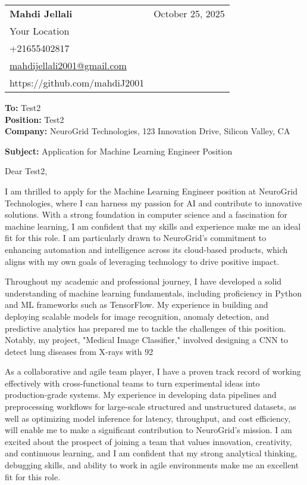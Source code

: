 \documentclass[letterpaper,11pt]{article}
\makeatletter
\newcommand{\letterHeading}[5]{
    \begin{tabular*}{\textwidth}{l@{\extracolsep{\fill}}r}
    \textbf{\Large #1} & #5 \\  %
    #2 & \\
    #3 & \\
    #4 & \\
    \end{tabular*}
    \vspace{15pt}
}
\newcommand{\letterRecipient}[3]{
    \textbf{\large To:} #1 \\
    \textbf{\large Position:} #2 \\
    \textbf{\large Company:} #3 \\
    \vspace{12pt}
}
\newcommand{\letterSubject}[1]{
    \textbf{\large Subject:} #1 \\
    \vspace{15pt}
}
\makeatother
\begin{document}
    \letterHeading
    {Mahdi Jellali}
    {Your Location}
    {+21655402817 \\ \href{mailto:mahdijellali2001@gmail.com}{mahdijellali2001@gmail.com}}
    {https://github.com/mahdiJ2001}
    {October 25, 2025}

    \letterRecipient
    {Test2}
    {Test2}
    {NeuroGrid Technologies, 123 Innovation Drive, Silicon Valley, CA}

    \letterSubject{Application for Machine Learning Engineer Position}

    Dear Test2,

    I am thrilled to apply for the Machine Learning Engineer position at NeuroGrid Technologies, where I can harness my passion for AI and contribute to innovative solutions. With a strong foundation in computer science and a fascination for machine learning, I am confident that my skills and experience make me an ideal fit for this role. I am particularly drawn to NeuroGrid's commitment to enhancing automation and intelligence across its cloud-based products, which aligns with my own goals of leveraging technology to drive positive impact.

    Throughout my academic and professional journey, I have developed a solid understanding of machine learning fundamentals, including proficiency in Python and ML frameworks such as TensorFlow. My experience in building and deploying scalable models for image recognition, anomaly detection, and predictive analytics has prepared me to tackle the challenges of this position. Notably, my project, "Medical Image Classifier," involved designing a CNN to detect lung diseases from X-rays with 92%

    As a collaborative and agile team player, I have a proven track record of working effectively with cross-functional teams to turn experimental ideas into production-grade systems. My experience in developing data pipelines and preprocessing workflows for large-scale structured and unstructured datasets, as well as optimizing model inference for latency, throughput, and cost efficiency, will enable me to make a significant contribution to NeuroGrid's mission. I am excited about the prospect of joining a team that values innovation, creativity, and continuous learning, and I am confident that my strong analytical thinking, debugging skills, and ability to work in agile environments make me an excellent fit for this role.
\end{document}

